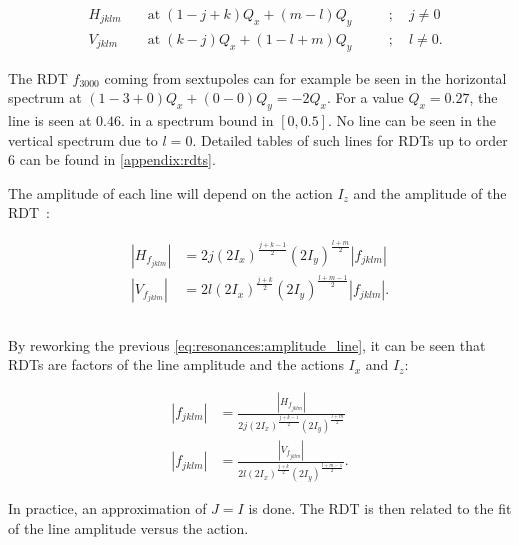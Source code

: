 \begin{equation}
    \begin{aligned}
    & H_{jklm} \;&&\text{at}\; (1 - j + k)Q_x + (m - l)Q_y \quad&&; \quad j \ne 0 \\
    & V_{jklm}   &&\text{at}\; (k - j)Q_x + (1 - l + m)Q_y      &&; \quad l \ne 0.
    \end{aligned}
    \label{eq:resonances:rdt_spectrum}
\end{equation}

The RDT $f_{3000}$ coming from sextupoles can for example be seen in the horizontal spectrum at
$(1-3+0)Q_x + (0-0)Q_y = -2Q_x$. For a value $Q_x = 0.27$, the line is seen at $0.46$. in a spectrum
bound in $[0, 0.5]$. No line can be seen in the vertical spectrum due to $l = 0$.
Detailed tables of such lines for RDTs up to order 6 can be found in \cref{appendix:rdts}.

The amplitude of each line will depend on the action $I_z$ and the amplitude of the
RDT~\cite{bartolini_normal_1997}:

\begin{equation}
    \begin{aligned}
    |H_{f_{jklm}}| &= 2 j (2 I_x)^\frac{j+k-1}{2} (2 I_y)^\frac{l+m}{2} |f_{jklm}| \\
    |V_{f_{jklm}}| &= 2 l (2 I_x)^\frac{j+k}{2} (2 I_y)^\frac{l+m-1}{2} |f_{jklm}|.
    \end{aligned}
    \label{eq:resonances:amplitude_line}
\end{equation}


\subsection{}

By reworking the previous \cref{eq:resonances:amplitude_line}, it can be seen that RDTs are factors
of the line amplitude and the actions $I_x$ and $I_z$:

\begin{equation}
    \begin{aligned}
    |f_{jklm}| &= \frac{|H_{f_{jklm}}|}{2 j (2 I_x)^\frac{j+k-1}{2} (2 I_y)^\frac{l+m}{2}} \\
    |f_{jklm}| &= \frac{|V_{f_{jklm}}|}{2 l (2 I_x)^\frac{j+k}{2} (2 I_y)^\frac{l+m-1}{2}} .
    \label{eq:resonances:amplitude_rdt}
    \end{aligned}
\end{equation}

In practice, an approximation of $J = I$ is done. The RDT is then related to the fit of the line
amplitude versus the action.%

